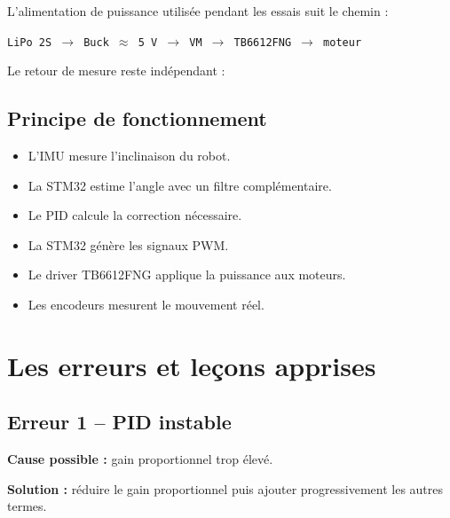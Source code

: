 \documentclass[11pt,a4paper]{article}
\begin{document}
	L'alimentation de puissance utilisée pendant les essais suit le chemin :
	
	\begin{center}
		\texttt{LiPo 2S $\rightarrow$ Buck $\approx$ 5 V $\rightarrow$ VM $\rightarrow$ TB6612FNG $\rightarrow$ moteur}
	\end{center}
	
	Le retour de mesure reste indépendant :
	
	\begin{center}
	\end{center}
	
	\subsection*{Principe de fonctionnement}
	
	\begin{itemize}
		\item L'IMU mesure l'inclinaison du robot.
		\item La STM32 estime l'angle avec un filtre complémentaire.
		\item Le PID calcule la correction nécessaire.
		\item La STM32 génère les signaux PWM.
		\item Le driver TB6612FNG applique la puissance aux moteurs.
		\item Les encodeurs mesurent le mouvement réel.
	\end{itemize}
	
	
	\section{Les erreurs et leçons apprises}
	
	\subsection*{Erreur 1 -- PID instable}
	
	\textbf{Cause possible :} gain proportionnel trop élevé.
	
	\textbf{Solution :} réduire le gain proportionnel puis ajouter progressivement les autres termes.
	
\end{document}
